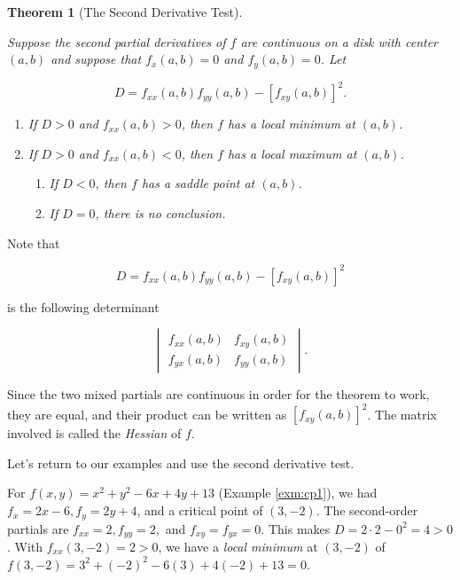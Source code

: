 \documentclass[
]{book}
\providecommand{\tightlist}{%
  \setlength{\itemsep}{0pt}\setlength{\parskip}{0pt}}
\newtheorem{theorem}{Theorem}[chapter]
\theoremstyle{definition}
\theoremstyle{definition}
\theoremstyle{definition}
\theoremstyle{definition}
\theoremstyle{remark}
\begin{document}
\begin{theorembox}

\begin{theorem}[The Second Derivative Test]
\protect\hypertarget{thm:SDT}{}\label{thm:SDT}

Suppose the second partial derivatives of \(f\) are continuous on a disk with center \((a,b)\) and suppose that \(f_x(a,b)=0\) and \(f_y(a,b)=0\). Let

\[D=f_{xx}(a,b)f_{yy}(a,b)-[f_{xy}(a,b)]^2.\]

\begin{enumerate}
\def\labelenumi{\arabic{enumi}.}
\item
  If \(D>0\) and \(f_{xx}(a,b)>0\), then \(f\) has a local minimum at \((a,b)\).
\item
  If \(D>0\) and \(f_{xx}(a,b)<0\), then \(f\) has a local maximum at \((a,b)\).

  \begin{enumerate}
  \def\labelenumii{\alph{enumii}.}
  \tightlist
  \item
    If \(D<0\), then \(f\) has a saddle point at \((a,b)\).
  \item
    If \(D=0\), there is no conclusion.
  \end{enumerate}
\end{enumerate}

\end{theorem}

\end{theorembox}

Note that

\[D=f_{xx}(a,b)f_{yy}(a,b)-[f_{xy}(a,b)]^2\]

is the following determinant

\[\begin{vmatrix}f_{xx}(a,b) & f_{xy}(a,b)\\f_{yx}(a,b) & f_{yy}(a,b)\end{vmatrix}.\]

Since the two mixed partials are continuous in order for the theorem to work, they are equal, and their product can be written as \([f_{xy}(a,b)]^2\). The matrix involved is called the \emph{Hessian} of \(f\).

Let's return to our examples and use the second derivative test.

For \(f(x,y)=x^2+y^2-6x+4y+13\) (Example \ref{exm:cp1}), we had \(f_x=2x-6, f_y=2y+4\), and a critical point of \((3,-2).\) The second-order partials are \(f_{xx}=2, f_{yy}=2,\) and \(f_{xy}=f_{yx}=0.\) This makes \(D=2\cdot 2-0^2=4>0\). With \(f_{xx}(3,-2)=2>0\), we have a \emph{local minimum} at \((3,-2)\) of \(f(3,-2)=3^2+(-2)^2-6(3)+4(-2)+13=0\).
\end{document}

